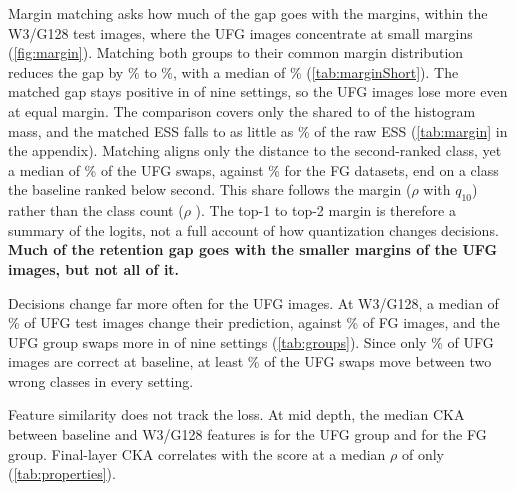 Margin matching asks how much of the gap goes with the margins, within the W3/G128 test images, where the UFG images concentrate at small margins (\cref{fig:margin}).
Matching both groups to their common margin distribution reduces the gap by \% to \%, with a median of \% (\cref{tab:marginShort}).
The matched gap stays positive in  of nine settings, so the UFG images lose more even at equal margin.
The comparison covers only the shared  to  of the histogram mass, and the matched ESS falls to as little as \% of the raw ESS (\cref{tab:margin} in the appendix).
Matching aligns only the distance to the second-ranked class, yet a median of \% of the UFG swaps, against \% for the FG datasets, end on a class the baseline ranked below second.
This share follows the margin ($\rho$  with $q_{10}$) rather than the class count ($\rho$ ).
The top-1 to top-2 margin is therefore a summary of the logits, not a full account of how quantization changes decisions.
\textbf{Much of the retention gap goes with the smaller margins of the UFG images, but not all of it.}

Decisions change far more often for the UFG images.
At W3/G128, a median of \% of UFG test images change their prediction, against \% of FG images, and the UFG group swaps more in  of nine settings (\cref{tab:groups}).
Since only \% of UFG images are correct at baseline, at least \% of the UFG swaps move between two wrong classes in every setting.



Feature similarity does not track the loss.
At mid depth, the median CKA between baseline and W3/G128 features is  for the UFG group and  for the FG group.
Final-layer CKA correlates with the score at a median $\rho$ of only  (\cref{tab:properties}).
